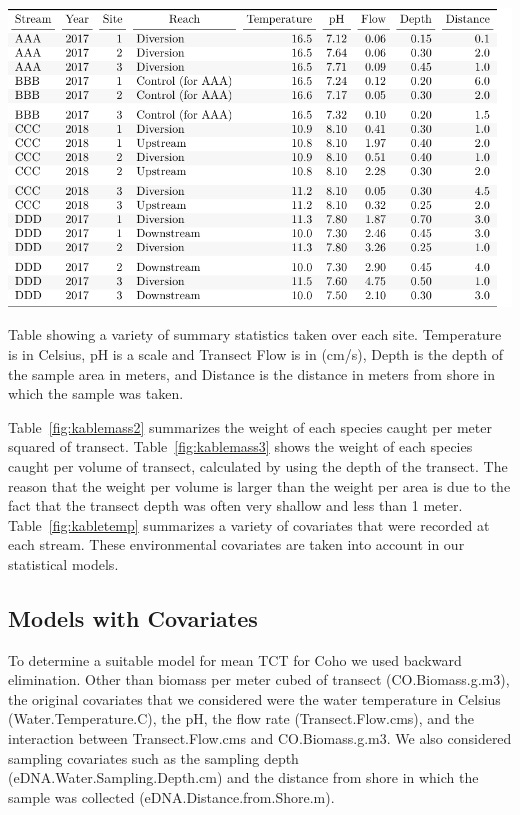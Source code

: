\begin{table}[H]
\includegraphics{Chapter5Images/test_update.pdf}
\caption{  \hspace{1mm}  Table showing a variety of summary statistics taken over each site. Temperature is in Celsius, pH is a scale and Transect Flow is in (cm/s), Depth is the depth of the sample area in meters, and Distance is the distance in meters from shore in which the sample was taken.}
\label{fig:kabletemp}
\end{table}

Table~\ref{fig:kablemass2} summarizes the weight of each species caught per meter squared of transect. Table~\ref{fig:kablemass3} shows the weight of each species caught per volume of transect, calculated by using the depth of the transect. The reason that the weight per volume is larger than the weight per area is due to the fact that the transect depth was often very shallow and less than 1 meter. Table~\ref{fig:kabletemp} summarizes a variety of covariates that were recorded at each stream. These environmental covariates are taken into account in our statistical models. 


\newpage

\subsection{Models with Covariates}

To determine a suitable model for mean TCT for Coho we used backward elimination. Other than biomass per meter cubed of transect (CO.Biomass.g.m3), the original covariates that we considered were the water temperature in Celsius (Water.Temperature.C), the pH, the flow rate (Transect.Flow.cms), and the interaction between Transect.Flow.cms and CO.Biomass.g.m3. We also considered sampling covariates such as the sampling depth (eDNA.Water.Sampling.Depth.cm) and the distance from shore in which the sample was collected (eDNA.Distance.from.Shore.m).

